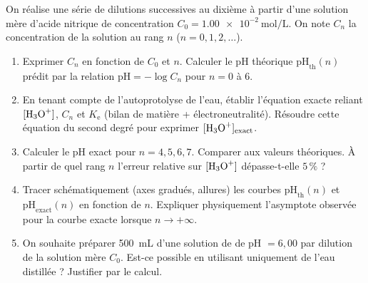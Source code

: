 \documentclass[11pt]{article}
\begin{document}
\begin{exercice}
On réalise une série de dilutions successives au dixième à partir d'une solution mère d'acide nitrique  de concentration $C_0 = \SI{1,00e-2}{\mole\per\liter}$. On note $C_n$ la concentration de la solution au rang $n$ ($n=0, 1, 2, \dots$).
\begin{enumerate}
    \item Exprimer $C_n$ en fonction de $C_0$ et $n$. Calculer le pH théorique $\text{pH}_\text{th}(n)$ prédit par la relation $\text{pH} = -\log C_n$ pour $n = 0$ à $6$.
    \item En tenant compte de l'autoprotolyse de l'eau, établir l'équation exacte reliant $[\ce{H3O+}]$, $C_n$ et $K_\text{e}$ (bilan de matière + électroneutralité). Résoudre cette équation du second degré pour exprimer $[\ce{H3O+}]_\text{exact}$.
    \item Calculer le pH exact pour $n = 4, 5, 6, 7$. Comparer aux valeurs théoriques. À partir de quel rang $n$ l'erreur relative sur $[\ce{H3O+}]$ dépasse-t-elle $5\,\%$ ?
    \item Tracer schématiquement (axes gradués, allures) les courbes $\text{pH}_\text{th}(n)$ et $\text{pH}_\text{exact}(n)$ en fonction de $n$. Expliquer physiquement l'asymptote observée pour la courbe exacte lorsque $n \to +\infty$.
    \item On souhaite préparer \SI{500}{\milli\liter} d'une solution de  de pH $= 6,00$ par dilution de la solution mère $C_0$. Est-ce possible en utilisant uniquement de l'eau distillée ? Justifier par le calcul.
\end{enumerate}
\end{exercice}
\end{document}
